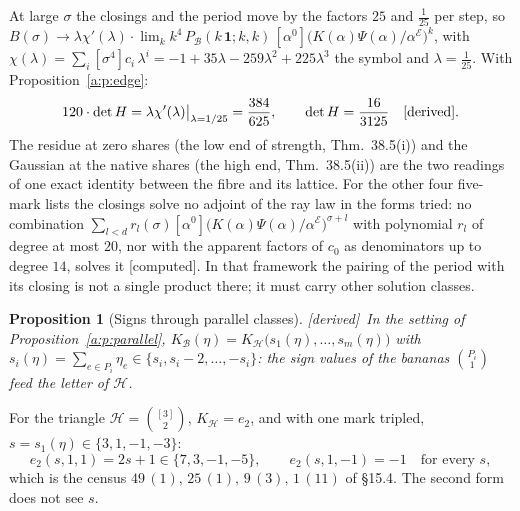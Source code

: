 \documentclass[11pt]{article}
\newcommand{\cE}{\mathcal E}
\newcommand{\cB}{\mathcal B}
\newcommand{\cH}{\mathcal H}
\newcommand{\one}{\mathbf 1}
\newcommand{\Pc}[1]{P_{\cB}(#1\,\one;#1,#1)}
\newcommand{\Clo}[1]{[\alpha^0]\big(K(\alpha)\Psi(\alpha)/\alpha^{\cE}\big)^{#1}}
\theoremstyle{plain}
\newtheorem{proposition}{Proposition}[section]
\theoremstyle{definition}
\theoremstyle{remark}
\newcommand{\derived}{\textup{[derived]}}
\newcommand{\computed}{\textup{[computed]}}
\begin{document}
At large $\sigma$ the closings and the period move by the factors $25$ and $\frac1{25}$ per step, so $B(\sigma)\to\lambda\chi'(\lambda)\cdot\lim_kk^4\,\Pc k\,\Clo k$, with $\chi(\lambda)=\sum_i[\sigma^4]c_i\,\lambda^i=-1+35\lambda-259\lambda^2+225\lambda^3$ the symbol and $\lambda=\frac1{25}$. With Proposition~\ref{a:p:edge}:
\[
120\cdot\det H=\lambda\chi'(\lambda)\big|_{\lambda=1/25}=\frac{384}{625},\qquad \det H=\frac{16}{3125}\quad\derived.
\]
The residue at zero shares (the low end of strength, Thm.~38.5(i)) and the Gaussian at the native shares (the high end, Thm.~38.5(ii)) are the two readings of one exact identity between the fibre and its lattice. For the other four five-mark lists the closings solve no adjoint of the ray law in the forms tried: no combination $\sum_{l<d}r_l(\sigma)\Clo{\sigma+l}$ with polynomial $r_l$ of degree at most $20$, nor with the apparent factors of $c_0$ as denominators up to degree $14$, solves it \computed. In that framework the pairing of the period with its closing is not a single product there; it must carry other solution classes.

\begin{proposition}[Signs through parallel classes]\label{a:p:signsparallel}\derived\
In the setting of Proposition~\ref{a:p:parallel}, $K_{\cB}(\eta)=K_{\cH}\big(s_1(\eta),\dots,s_m(\eta)\big)$ with $s_i(\eta)=\sum_{e\in P_i}\eta_e\in\{s_i,s_i-2,\dots,-s_i\}$: the sign values of the bananas $\binom{P_i}1$ feed the letter of $\cH$.
\end{proposition}

For the triangle $\cH=\binom{[3]}2$, $K_{\cH}=e_2$, and with one mark tripled, $s=s_1(\eta)\in\{3,1,-1,-3\}$:
\[
e_2(s,1,1)=2s+1\in\{7,3,-1,-5\},\qquad e_2(s,1,-1)=-1\quad\text{for every }s,
\]
which is the census $49\,(1),\,25\,(1),\,9\,(3),\,1\,(11)$ of \S15.4. The second form does not see $s$.
\end{document}
